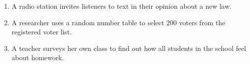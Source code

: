 \documentclass[10pt]{article}
\begin{document}
\vspace{0.1in}

\begin{practicebox}
\small
\vspace{6pt}
\begin{enumerate}[leftmargin=1.5em, itemsep=10pt]
  \item A radio station invites listeners to text in their opinion about a new law.
        \ans{$\times$} \quad {}

  \item A researcher uses a random number table to select 200 voters from the registered voter list.
        \ans{\checkmark} \quad {}

  \item A teacher surveys her own class to find out how all students in the school feel about homework.
        \ans{$\times$} \quad {}
\end{enumerate}
\end{practicebox}
\end{document}
